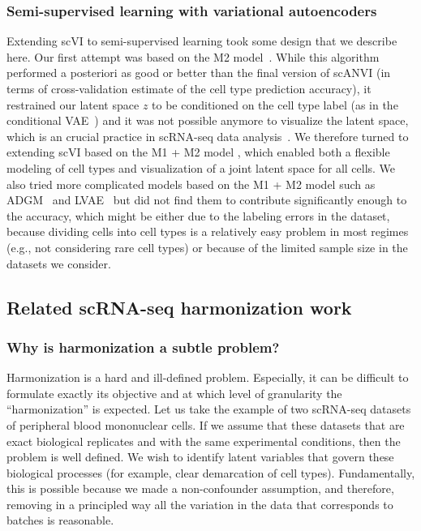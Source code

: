 \subsubsection{Semi-supervised learning with variational autoencoders}
Extending scVI to semi-supervised learning took some design that we describe here. Our first attempt was based on the M2 model~\cite{m1m2}. While this algorithm performed a posteriori as good or better than the final version of scANVI (in terms of cross-validation estimate of the cell type prediction accuracy), it restrained our latent space $z$ to be conditioned on the cell type label (as in the conditional VAE~\cite{NIPS2015_5775}) and it was not possible anymore to visualize the latent space, which is an crucial practice in scRNA-seq data analysis~\cite{Becht2018}. We therefore turned to extending scVI based on the M1 + M2 model \cite{m1m2}, which enabled both a flexible modeling of cell types and visualization of a joint latent space for all cells. We also tried more complicated models based on the M1 + M2 model such as ADGM~\cite{maaloe2016auxiliary} and LVAE~\cite{rasmus2015semi} but did not find them to contribute significantly enough to the accuracy, which might be either due to the labeling errors in the dataset, because dividing cells into cell types is a relatively easy problem in most regimes (e.g., not considering rare cell types) or because of the limited sample size in the datasets we consider. 


\subsection{Related scRNA-seq harmonization work}
\label{scanviassumptions}

\subsubsection{Why is harmonization a subtle problem?}
Harmonization is a hard and ill-defined problem. Especially, it can be difficult to formulate exactly its objective and at which level of granularity the ``harmonization'' is expected. Let us take the example of two scRNA-seq datasets of peripheral blood mononuclear cells. If we assume that these datasets that are exact biological replicates and with the same experimental conditions, then the problem is well defined. We wish to identify latent variables that govern these biological processes (for example, clear demarcation of cell types). Fundamentally, this is possible because we made a  non-confounder assumption, and therefore, removing in a principled way all the variation in the data that corresponds to batches is reasonable. 


